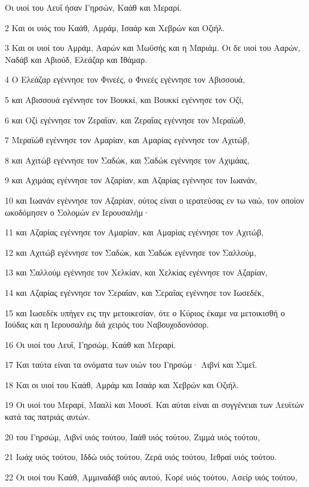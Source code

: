 \par Οι υιοί του Λευΐ ήσαν Γηρσών, Καάθ και Μεραρί.
\par 2 Και οι υιός του Καάθ, Αμράμ, Ισαάρ και Χεβρών και Οζιήλ.
\par 3 Και οι υιοί του Αμράμ, Ααρών και Μωϋσής και η Μαριάμ. Οι δε υιοί του Ααρών, Ναδάβ και Αβιούδ, Ελεάζαρ και Ιθάμαρ.
\par 4 Ο Ελεάζαρ εγέννησε τον Φινεές, ο Φινεές εγέννησε τον Αβισσουά,
\par 5 και Αβισσουά εγέννησε τον Βουκκί, και Βουκκί εγέννησε τον Οζί,
\par 6 και Οζί εγέννησε τον Ζεραΐαν, και Ζεραΐας εγέννησε τον Μεραϊώθ,
\par 7 Μεραϊώθ εγέννησε τον Αμαρίαν, και Αμαρίας εγέννησε τον Αχιτώβ,
\par 8 και Αχιτώβ εγέννησε τον Σαδώκ, και Σαδώκ εγέννησε τον Αχιμάας,
\par 9 και Αχιμάας εγέννησε τον Αζαρίαν, και Αζαρίας εγέννησε τον Ιωανάν,
\par 10 και Ιωανάν εγέννησε τον Αζαρίαν, ούτος είναι ο ιερατεύσας εν τω ναώ, τον οποίον ωκοδόμησεν ο Σολομών εν Ιερουσαλήμ·
\par 11 και Αζαρίας εγέννησε τον Αμαρίαν, και Αμαρίας εγέννησε τον Αχιτώβ,
\par 12 και Αχιτώβ εγέννησε τον Σαδώκ, και Σαδώκ εγέννησε τον Σαλλούμ,
\par 13 και Σαλλούμ εγέννησε τον Χελκίαν, και Χελκίας εγέννησε τον Αζαρίαν,
\par 14 και Αζαρίας εγέννησε τον Σεραΐαν, και Σεραΐας εγέννησε τον Ιωσεδέκ,
\par 15 και Ιωσεδέκ υπήγεν εις την μετοικεσίαν, ότε ο Κύριος έκαμε να μετοικισθή ο Ιούδας και η Ιερουσαλήμ διά χειρός του Ναβουχοδονόσορ.
\par 16 Οι υιοί του Λευΐ, Γηρσώμ, Καάθ και Μεραρί.
\par 17 Και ταύτα είναι τα ονόματα των υιών του Γηρσώμ· Λιβνί και Σιμεΐ.
\par 18 Και οι υιοί του Καάθ, Αμράμ και Ισαάρ και Χεβρών και Οζιήλ.
\par 19 Οι υιοί του Μεραρί, Μααλί και Μουσί. Και αύται είναι αι συγγένειαι των Λευϊτών κατά τας πατριάς αυτών.
\par 20 του Γηρσώμ, Λιβνί υιός τούτου, Ιαάθ υιός τούτου, Ζιμμά υιός τούτου,
\par 21 Ιωάχ υιός τούτου, Ιδδώ υιός τούτου, Ζερά υιός τούτου, Ιεθραί υιός τούτου.
\par 22 Οι υιοί του Καάθ, Αμμιναδάβ υιός αυτού, Κορέ υιός τούτου, Ασείρ υιός τούτου,
